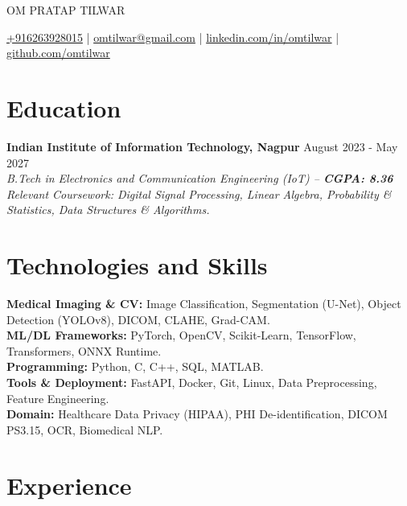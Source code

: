\documentclass[10pt]{article}        %
\begin{document}
\centerline{\Huge {OM PRATAP TILWAR}}

\vspace{5pt}

\centerline{\href{tel:+916263928015}{+916263928015} |
\href{mailto:omtilwar@gmail.com}{omtilwar@gmail.com} | \href{https://www.linkedin.com/in/omtilwar}{linkedin.com/in/omtilwar} | \href{https://github.com/omtilwar}{github.com/omtilwar}}

\vspace{-18pt}

\section*{Education}
\textbf{Indian Institute of Information Technology, Nagpur} \hfill August 2023 - May 2027 \\
\textit{B.Tech in Electronics and Communication Engineering (IoT)    --     \textbf{\textcolor{NavyBlue}{CGPA: 8.36}}} \\
\textit{Relevant Coursework: Digital Signal Processing, Linear Algebra, Probability \& Statistics, Data Structures \& Algorithms.}

\vspace{-8.5pt}

\section*{Technologies and Skills}
\textbf{Medical Imaging \& CV:} Image Classification, Segmentation (U-Net), Object Detection (YOLOv8), DICOM, CLAHE, Grad-CAM. \\
\textbf{ML/DL Frameworks:} PyTorch, OpenCV, Scikit-Learn, TensorFlow, Transformers, ONNX Runtime. \\
\textbf{Programming:} Python, C, C++, SQL, MATLAB. \\
\textbf{Tools \& Deployment:} FastAPI, Docker, Git, Linux, Data Preprocessing, Feature Engineering. \\
\textbf{Domain:} Healthcare Data Privacy (HIPAA), PHI De-identification, DICOM PS3.15, OCR, Biomedical NLP.

\vspace{-8.5pt}

\section*{Experience}
\end{document}
